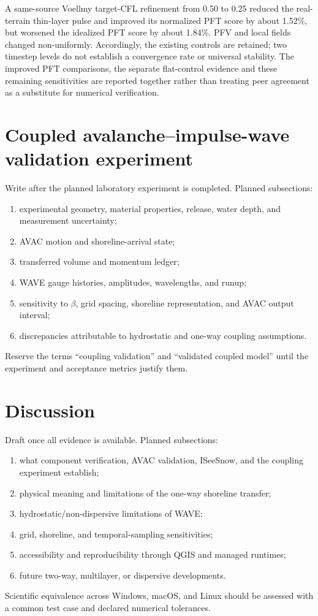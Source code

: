 \documentclass[11pt,a4paper]{article}
\begin{document}
A same-source Voellmy target-CFL refinement from 0.50 to 0.25 reduced the
real-terrain thin-layer pulse and improved its normalized PFT score by about
1.52\%, but worsened the idealized PFT score by about 1.84\%. PFV and local
fields changed non-uniformly. Accordingly, the existing controls are retained;
two timestep levels do not establish a convergence rate or universal
stability. The improved PFT comparisons, the separate flat-control evidence
and these remaining sensitivities are reported together rather than treating
peer agreement as a substitute for numerical verification.






\newpage
\section{Coupled avalanche--impulse-wave validation experiment}
\label{sec:coupled-experiment}

Write after the planned laboratory experiment is completed.  Planned subsections:
\begin{enumerate}
  \item experimental geometry, material properties, release, water depth, and
        measurement uncertainty;
  \item AVAC motion and shoreline-arrival state;
  \item transferred volume and momentum ledger;
  \item WAVE gauge histories, amplitudes, wavelengths, and runup;
  \item sensitivity to $\beta$, grid spacing, shoreline representation, and
        AVAC output interval;
  \item discrepancies attributable to hydrostatic and one-way coupling
        assumptions.
\end{enumerate}
Reserve the terms ``coupling validation'' and ``validated coupled model'' until
the experiment and acceptance metrics justify them.

\newpage
\section{Discussion}
\label{sec:discussion}


Draft once all evidence is available.  Planned subsections:
\begin{enumerate}
  \item what component verification, AVAC validation, ISeeSnow, and the
        coupling experiment establish;
  \item physical meaning and limitations of the one-way shoreline transfer;
  \item hydrostatic/non-dispersive limitations of WAVE;
  \item grid, shoreline, and temporal-sampling sensitivities;
  \item accessibility and reproducibility through QGIS and managed runtimes;
  \item future two-way, multilayer, or dispersive developments.
\end{enumerate}
Scientific equivalence across Windows, macOS, and Linux should be assessed
with a common test case and declared numerical tolerances.
\end{document}

